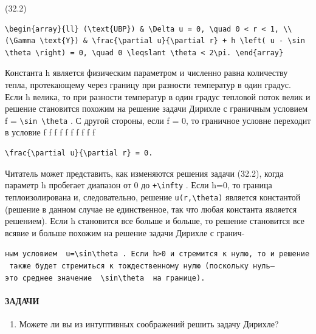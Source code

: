 \documentclass[
  ukrainian,
]{article}
\providecommand{\tightlist}{%
  \setlength{\itemsep}{0pt}\setlength{\parskip}{0pt}}
\begin{document}
(32.2)

\begin{verbatim}
\begin{array}{ll} (\text{UBP}) & \Delta u = 0, \quad 0 < r < 1, \\ (\Gamma \text{Y}) & \frac{\partial u}{\partial r} + h \left( u - \sin \theta \right) = 0, \quad 0 \leqslant \theta < 2\pi. \end{array}
\end{verbatim}

Константа h является физическим параметром и численно равна количеству
тепла, протекающему через границу при разности температур в один градус.
Если h велика, то при разности температур в один градус тепловой поток
велик и решение становится похожим на решение задачи Дирихле с граничным
условием f = \texttt{\textbackslash{}sin\ \textbackslash{}theta} . С
другой стороны, если f = 0, то граничное условне переходит в условие f f
f f f f f f f f

\begin{verbatim}
\frac{\partial u}{\partial r} = 0.
\end{verbatim}

Читатель может представить, как изменяются решения задачи (32.2), когда
параметр h пробегает диапазон от 0 до \texttt{+\textbackslash{}infty} .
Если h=0, то граница теплоизолирована и, следовательно, решение
\texttt{u(r,\textbackslash{}theta)} является константой (решение в
данном случае не единственное, так что любая константа является
решением). Если h становится все больше и больше, то решение становится
все всявие и больше похожим на решение задачи Дирихле с гранич-

\texttt{ным\ условием\ \ \textquotesingle{}u=\textbackslash{}sin\textbackslash{}theta\textquotesingle{}\ .\ Если\ h\textgreater{}0\ и\ стремится\ к\ нулю,\ то\ и\ решение\ также\ будет\ стремиться\ к\ тождественному\ нулю\ (поскольку\ нуль—это\ среднее\ значение\ \ \textquotesingle{}\textbackslash{}sin\textbackslash{}theta\textquotesingle{}\ \ на\ границе).}

\paragraph{ЗАДАЧИ}\label{ux437ux430ux434ux430ux447ux438-2}

\begin{enumerate}
\def\labelenumi{\arabic{enumi}.}
\tightlist
\item
  Можете ли вы из интуптивных соображений решить задачу Дирихле?
\end{enumerate}
\end{document}
